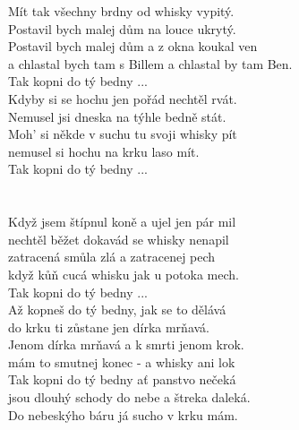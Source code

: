 \begin{multicols}{2}
\singlespacing
Mít tak všechny brdny od whisky vypitý. \\
Postavil bych malej dům na louce ukrytý. \\
Postavil bych malej dům a z okna koukal ven \\
a chlastal bych tam s Billem a chlastal by tam Ben. \\

Tak kopni do tý bedny ... \\

Kdyby si se hochu jen pořád nechtěl rvát. \\
Nemusel jsi dneska na týhle bedně stát. \\
Moh' si někde v suchu tu svoji whisky pít\\
nemusel si hochu na krku laso mít. \\

Tak kopni do tý bedny ... \\
\\
\\

Když jsem štípnul koně a ujel jen pár mil\\
nechtěl běžet dokavád se whisky nenapil\\
zatracená smůla zlá a zatracenej pech\\
když kůň cucá whisku jak u potoka mech.\\

Tak kopni do tý bedny ...\\

Až kopneš do tý bedny, jak se to dělává \\
do krku ti zůstane jen dírka mrňavá. \\
Jenom dírka mrňavá a k smrti jenom krok. \\
mám to smutnej konec - a whisky ani lok\\

Tak kopni do tý bedny ať panstvo nečeká \\
jsou dlouhý schody do nebe a štreka daleká. \\
Do nebeskýho báru já sucho v krku mám. \\
\end{multicols}